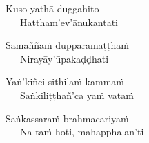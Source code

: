 \begin{hanging-indent}
Kuso yathā duggahito\\
Hattham'ev'ānukantati
\end{hanging-indent}

\ifninebythirteenversion \clearpage \fi

\begin{hanging-indent}
Sāmaññaṁ dupparāmaṭṭhaṁ\\
Nirayāy'ūpakaḍḍhati
\end{hanging-indent}

\begin{hanging-indent}
Yaṅ'kiñci sithilaṁ kammaṁ\\
Saṅkiliṭṭhañ'ca yaṁ vataṁ
\end{hanging-indent}

\begin{hanging-indent}
Saṅkassaraṁ brahmacariyaṁ\\
Na taṁ hoti, mahapphalan'ti
\end{hanging-indent}

\suttaRef{[SN 2.8]}

\clearpage

